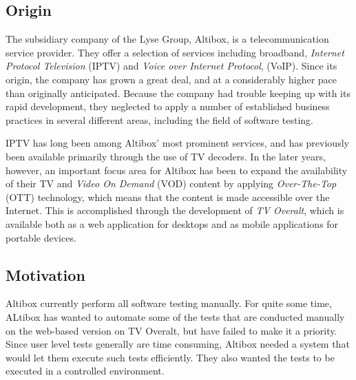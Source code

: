








\subsection{Origin} %
The subsidiary company of the Lyse Group, Altibox, is a telecommunication service provider. They offer a selection of services including broadband, \emph{Internet Protocol Television} (IPTV) and \emph{Voice over Internet Protocol}, (VoIP). Since its origin, the company has grown a great deal, and at a considerably higher pace than originally anticipated. Because the company had trouble keeping up with its rapid development, they neglected to apply a number of established business practices in several different areas, including the field of software testing. 

IPTV has long been among Altibox' most prominent services, and has previously been available primarily through the use of TV decoders. In the later years, however, an important focus area for Altibox has been to expand the availability of their TV and \emph{Video On Demand} (VOD) content by applying \emph{Over-The-Top} (OTT) technology, which means that the content is made accessible over the Internet. This is accomplished through the development of \emph{TV Overalt}, which is available both as a web application for desktops and as mobile applications for portable devices. %

\subsection{Motivation} %
Altibox currently perform all software testing manually. For quite some time, ALtibox has wanted to automate some of the tests that are conducted manually on the web-based version on TV Overalt, but have failed to make it a priority. Since user level tests generally are time consuming, Altibox needed a system that would let them execute such tests efficiently. They also wanted the tests to be executed in a controlled environment.

